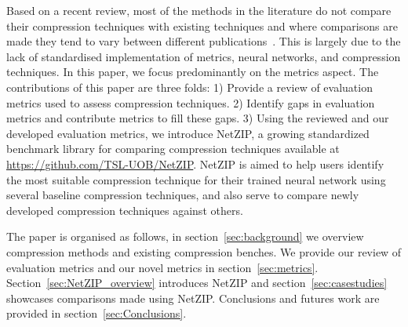  




Based on a recent review, most of the methods in the literature do not compare their compression techniques with existing techniques and where comparisons are made they tend to vary between different publications~\cite{Blalock2020}.
%
This is largely due to the lack of standardised implementation of metrics, neural networks, and compression techniques. 
%
In this paper, we focus predominantly on the metrics aspect.
%
The contributions of this paper are three folds: 
    1) Provide a review of evaluation metrics used to assess compression techniques. 
    2) Identify gaps in evaluation metrics and contribute metrics to fill these gaps.
    3) Using the reviewed and our developed evaluation metrics, we introduce NetZIP, a growing standardized benchmark library for comparing compression techniques available at \url{https://github.com/TSL-UOB/NetZIP}. NetZIP is aimed to help users identify the most suitable compression technique for their trained neural network using several baseline compression techniques, and also serve to compare newly developed compression techniques against others.%
%

The paper is organised as follows, in section~\ref{sec:background} we overview compression methods and existing compression benches. We provide our review of evaluation metrics and our novel metrics in section~\ref{sec:metrics}. Section~\ref{sec:NetZIP_overview} introduces NetZIP and section~\ref{sec:casestudies} showcases comparisons made using NetZIP. Conclusions and futures work are provided in section~\ref{sec:Conclusions}.

